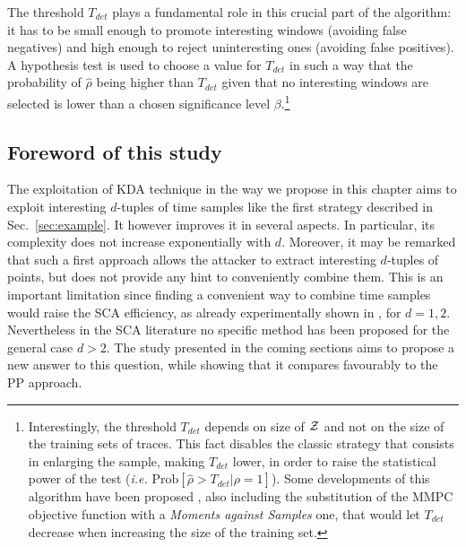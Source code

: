 The threshold $T_{det}$ plays a fundamental role in this crucial part of the algorithm: it has to be small enough to promote interesting windows (avoiding false negatives) and high enough to reject uninteresting ones (avoiding false positives). A hypothesis test is used to choose a value for $T_{det}$ in such a way that the probability of $\hat{\rho}$ being higher than $T_{det}$ given that no interesting windows are selected is lower than a chosen significance level $\beta$.\footnote{Interestingly, the threshold $T_{det}$ depends on size of $\mathcal{Z}$ and not on the size of the training sets of traces. This fact disables the classic strategy that consists in enlarging the sample, making $T_{det}$ lower, in order to raise the statistical power of the test (\emph{i.e.} $\mathrm{Prob}[\hat{\rho}>T_{det}\vert \rho=1]$). Some developments of this algorithm have been proposed \cite{durvauximproved}, also including the substitution of the MMPC objective function with a \emph{Moments against Samples} one, that would let $T_{det}$ decrease when increasing the size of the training set.} \\

\subsection{Foreword of this study}

The exploitation of KDA technique in the way we propose in this chapter aims to exploit interesting $d$-tuples of time samples like the first strategy described in Sec.~\ref{sec:example}. It however improves it in several aspects. In particular, its complexity does not increase exponentially with $d$. Moreover, it may be remarked that such a first approach allows the attacker to extract interesting $d$-tuples of points, but does not provide any hint to conveniently combine them. This is an important limitation since  finding a convenient way to combine time samples would raise the SCA efficiency, as already experimentally shown in \cite{boosting}, for $d = 1,2$. Nevertheless in the SCA literature no specific method has been proposed for the general case $d>2$.  The study presented in the coming sections aims to propose a new answer to this question, while showing that it compares favourably to the PP approach.

